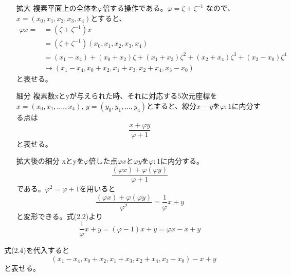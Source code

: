 \documentclass[uplatex,dvipdfmx]{ujreport}
\begin{document}
\begin{itemize}
 \item [拡大]
       複素平面上の全体を$\varphi$倍する操作である。$\varphi=\zeta+\zeta^{-1}$
       なので、$x=(x_0,x_1,x_2,x_3,x_4)$とすると、
       \begin{equation}
	\begin{split}
	 \varphi x = 
	 &=(\zeta+\zeta^{-1})x \\
	 &=(\zeta+\zeta^{-1})(x_0,x_1,x_2,x_3,x_4)\\
	 &=(x_1-x_4) + (x_0+x_2)\zeta + (x_1+x_3)\zeta^2 + (x_2+x_4)\zeta^3 + (x_3-x_0)\zeta^4\\
	 &\mapsto(x_1-x_4, x_0+x_2, x_1+x_3, x_2+x_4, x_3-x_0)
	\end{split}
       \end{equation}
       と表せる。
       
 \item [細分]
       複素数xとyが与えられた時、それに対応する$5$次元座標を$x=(x_0,x_1,....,x_4)$,
       $y=(y_0,y_1,...,y_4)$とすると、線分$x-y$を$\varphi:1$に内分する点は
       \begin{equation}
	\frac{x+\varphi y}{\varphi+1}
       \end{equation}
       と表せる。
 \item [拡大後の細分]
       xとyを$\varphi$倍した点$\varphi x$と$\varphi y$を$\varphi:1$に内分する。
       \[
       \frac{(\varphi x)+\varphi(\varphi y)}{\varphi+1}
       \]
       である。$\varphi^2=\varphi+1$を用いると
       \[
       \frac{(\varphi x)+\varphi(\varphi y)}{\varphi^2}=\frac{1}{\varphi}x+y
       \]
       と変形できる。式(2.2)より
       \[
       \frac{1}{\varphi} x+y=(\varphi-1)x+y
       =\varphi x-x+y
       \]

\end{itemize}
式(2.4)を代入すると
\[
 (x_1-x_4, x_0+x_2, x_1+x_3, x_2+x_4, x_3-x_0)-x+y
 \]
と表せる。
\end{document}
